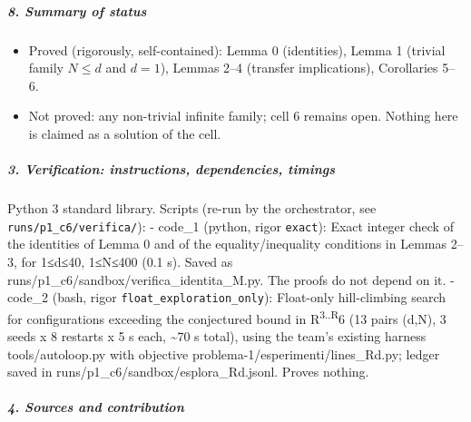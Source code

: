 \documentclass[11pt,a4paper]{article}
\providecommand{\tightlist}{\setlength{\itemsep}{0pt}\setlength{\parskip}{0pt}}
\begin{document}
\subparagraph{8. Summary of status}\label{summary-of-status}

\begin{itemize}
\tightlist
\item
  Proved (rigorously, self-contained): Lemma 0 (identities), Lemma 1
  (trivial family \(N\le d\) and \(d=1\)), Lemmas 2--4 (transfer
  implications), Corollaries 5--6.
\item
  Not proved: any non-trivial infinite family; cell 6 remains open.
  Nothing here is claimed as a solution of the cell.
\end{itemize}

\subparagraph{3. Verification: instructions, dependencies,
timings}\label{verification-instructions-dependencies-timings}

Python 3 standard library. Scripts (re-run by the orchestrator, see
\texttt{runs/p1\_c6/verifica/}): - code\_1 (python, rigor
\texttt{exact}): Exact integer check of the identities of Lemma 0 and of
the equality/inequality conditions in Lemmas 2--3, for 1≤d≤40, 1≤N≤400
(0.1 s). Saved as runs/p1\_c6/sandbox/verifica\_identita\_M.py. The
proofs do not depend on it. - code\_2 (bash, rigor
\texttt{float\_exploration\_only}): Float-only hill-climbing search for
configurations exceeding the conjectured bound in
R\textsuperscript{3..R}6 (13 pairs (d,N), 3 seeds x 8 restarts x 5 s
each, \textasciitilde70 s total), using the team's existing harness
tools/autoloop.py with objective problema-1/esperimenti/lines\_Rd.py;
ledger saved in runs/p1\_c6/sandbox/esplora\_Rd.jsonl. Proves nothing.

\subparagraph{4. Sources and
contribution}\label{sources-and-contribution}
\end{document}
